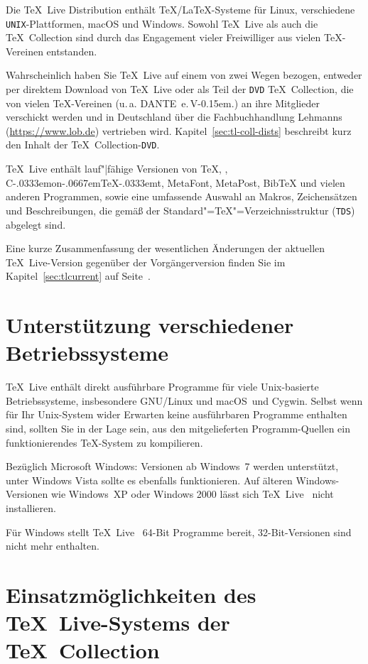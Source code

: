 \documentclass[12pt,ngerman,a4paper,fullparskip]{report}
\newcommand{\TL}{\TeX\ Live\xspace}
\newcommand{\acro}[1]{\texttt{#1}}
\def\TK{\TeX\ Collection}
\newcommand\ConTeXt{C\kern-.0333emon\-\kern-.0667em\TeX\kern-.0333emt}
\def\MP{MetaPost}
\def\MF{MetaFont}
\def\BibTeX{Bib\TeX}
\providecommand*{\DVD}{\acro{DVD}\xspace}
\providecommand*{\macOS}{macOS\xspace}
\providecommand*{\TDS}{\acro{TDS}\xspace}
\newcommand{\dante}{DANTE~e.\,V\kern-0.15em.}
\begin{document}
Die {\TL} Distribution enthält \TeX/\LaTeX-Systeme für Linux, verschiedene \acro{UNIX}-Plattformen, {\macOS} und Windows. Sowohl \TL{} als auch die \TK{} sind durch das Engagement vieler Freiwilliger aus vielen \TeX-Vereinen  entstanden. 

Wahrscheinlich haben Sie \TL{} auf einem von zwei Wegen bezogen, entweder per direktem Download von \TL{} oder als Teil der \DVD{} \TK, die von vielen \TeX-Vereinen (u.\,a. \dante) an ihre Mitglieder verschickt werden und in Deutschland über die Fachbuchhandlung Lehmanns (\url{https://www.lob.de})
vertrieben wird. Kapitel~\ref{sec:tl-coll-dists} beschreibt kurz den Inhalt der \TK-\DVD. 



{\TL} enthält lauf"|fähige Versionen von \TeX, \LaTeXe, \ConTeXt, \MF, \MP, {\BibTeX}  und vielen anderen Programmen, sowie eine umfassende Auswahl an Makros, Zeichensätzen und Beschreibungen, die gemäß der Standard"=\TeX"=Verzeichnisstruktur (\TDS) abgelegt sind.

Eine kurze Zusammenfassung der wesentlichen Änderungen der aktuellen \TL-Version gegenüber der Vorgängerversion finden Sie im Kapitel~\ref{sec:tlcurrent} auf Seite~\pageref{sec:tlcurrent}.

\section{Unterstützung verschiedener Betriebssysteme}\label{sec:os-support}

\TL{} enthält direkt ausführbare Programme für viele Unix-basierte Betriebssysteme, insbesondere GNU/Linux und \macOS\ und Cygwin. Selbst wenn für Ihr Unix-System wider Erwarten keine ausführbaren Programme enthalten sind, sollten Sie in der Lage sein, aus den mitgelieferten Programm-Quellen ein funktionierendes \TeX-System zu kompilieren.

Bezüglich Microsoft Windows: Versionen ab Windows~7 werden unterstützt, unter Windows Vista sollte es ebenfalls funktionieren. Auf älteren Windows-Versionen wie Windows~XP oder Windows 2000 lässt sich \TL~ nicht installieren.

Für Windows stellt \TL~ 64-Bit Programme bereit, 32-Bit-Versionen sind nicht mehr enthalten.

\section{Einsatzmöglichkeiten des \TL-Systems der \TeX\ Collection}\label{sec:basic}
\end{document}
